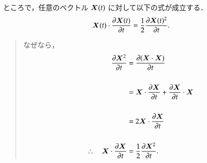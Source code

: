         ところで，任意のベクトル $\boldsymbol{X}(t)$ に対して以下の式が成立する．
                                \begin{align}
                                \boldsymbol{X} (t)\cdot\frac{\partial \boldsymbol{X} (t)}{\partial t}=\frac{1}{2} \frac{\partial \boldsymbol{X}(t)^{2}}{ \partial t} .
                                \end{align}
                                \begin{quotation}\small
                                                                なぜなら，
                                \begin{align*}
                                \frac{\partial \boldsymbol{X}^{2}}{\partial t}&=\frac{\partial (\boldsymbol{X}\cdot \boldsymbol{X})}{\partial t} \\ \notag \\ \notag
                                &=\boldsymbol{X}\cdot\frac{\partial  \boldsymbol{X}}{\partial t}+\frac{\partial  \boldsymbol{X}}{\partial t}\cdot\boldsymbol{X} \\ \notag \\ \notag
                                &=2\boldsymbol{X}\cdot\frac{\partial \boldsymbol{X}}{\partial t}\\ \notag \notag \\
                                \therefore\quad
                                \boldsymbol{X} \cdot\frac{\partial \boldsymbol{X} }{\partial t}&=\frac{1}{2} \frac{\partial \boldsymbol{X}^{2}}{ \partial t} .
                                \end{align*}
                                \end{quotation}

